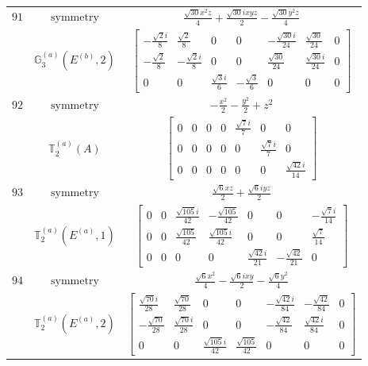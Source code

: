 \documentclass[fleqn,8pt,landscape]{jsarticle}
\begin{document}
\begin{longtable}{ccc}
$ 91 $ & $ \text{symmetry} $ & $ \frac{\sqrt{30} x^{2} z}{4} + \frac{\sqrt{30} i x y z}{2} - \frac{\sqrt{30} y^{2} z}{4} $ \\
$  $ & $ \mathbb{G}_{3}^{(a)}(E^{(b)},2) $ & $ \begin{bmatrix} - \frac{\sqrt{2} i}{8} & \frac{\sqrt{2}}{8} & 0 & 0 & - \frac{\sqrt{30} i}{24} & \frac{\sqrt{30}}{24} & 0 \\ - \frac{\sqrt{2}}{8} & - \frac{\sqrt{2} i}{8} & 0 & 0 & \frac{\sqrt{30}}{24} & \frac{\sqrt{30} i}{24} & 0 \\ 0 & 0 & \frac{\sqrt{3} i}{6} & - \frac{\sqrt{3}}{6} & 0 & 0 & 0 \end{bmatrix} $ \\ \hline
$ 92 $ & $ \text{symmetry} $ & $ - \frac{x^{2}}{2} - \frac{y^{2}}{2} + z^{2} $ \\
$  $ & $ \mathbb{T}_{2}^{(a)}(A) $ & $ \begin{bmatrix} 0 & 0 & 0 & 0 & \frac{\sqrt{7} i}{7} & 0 & 0 \\ 0 & 0 & 0 & 0 & 0 & \frac{\sqrt{7} i}{7} & 0 \\ 0 & 0 & 0 & 0 & 0 & 0 & \frac{\sqrt{42} i}{14} \end{bmatrix} $ \\ \hline
$ 93 $ & $ \text{symmetry} $ & $ \frac{\sqrt{6} x z}{2} + \frac{\sqrt{6} i y z}{2} $ \\
$  $ & $ \mathbb{T}_{2}^{(a)}(E^{(a)},1) $ & $ \begin{bmatrix} 0 & 0 & \frac{\sqrt{105} i}{42} & - \frac{\sqrt{105}}{42} & 0 & 0 & - \frac{\sqrt{7} i}{14} \\ 0 & 0 & \frac{\sqrt{105}}{42} & \frac{\sqrt{105} i}{42} & 0 & 0 & \frac{\sqrt{7}}{14} \\ 0 & 0 & 0 & 0 & \frac{\sqrt{42} i}{21} & - \frac{\sqrt{42}}{21} & 0 \end{bmatrix} $ \\ \hline
$ 94 $ & $ \text{symmetry} $ & $ \frac{\sqrt{6} x^{2}}{4} - \frac{\sqrt{6} i x y}{2} - \frac{\sqrt{6} y^{2}}{4} $ \\
$  $ & $ \mathbb{T}_{2}^{(a)}(E^{(a)},2) $ & $ \begin{bmatrix} \frac{\sqrt{70} i}{28} & \frac{\sqrt{70}}{28} & 0 & 0 & - \frac{\sqrt{42} i}{84} & - \frac{\sqrt{42}}{84} & 0 \\ - \frac{\sqrt{70}}{28} & \frac{\sqrt{70} i}{28} & 0 & 0 & - \frac{\sqrt{42}}{84} & \frac{\sqrt{42} i}{84} & 0 \\ 0 & 0 & \frac{\sqrt{105} i}{42} & \frac{\sqrt{105}}{42} & 0 & 0 & 0 \end{bmatrix} $ \\ \hline

\end{longtable}
\end{document}
